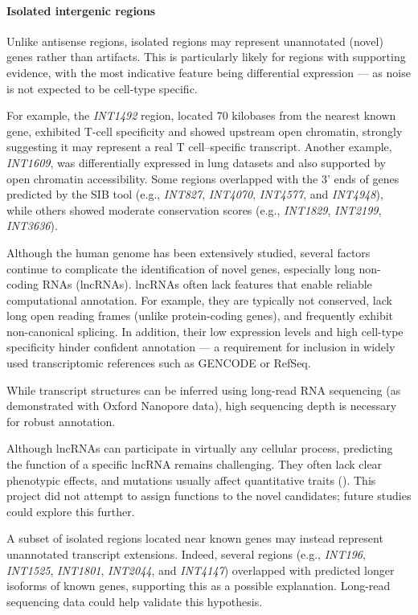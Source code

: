 \paragraph{Isolated intergenic regions}

Unlike antisense regions, isolated regions may represent unannotated (novel) genes rather than artifacts.
This is particularly likely for regions with supporting evidence,
with the most indicative feature being differential expression —
as noise is not expected to be cell-type specific.

For example, the \textit{INT1492} region, located 70 kilobases from the nearest known gene,
exhibited T-cell specificity and showed upstream open chromatin, strongly suggesting it may represent a real T cell–specific transcript.
Another example, \textit{INT1609}, was differentially expressed in lung datasets and also supported by open chromatin accessibility.
Some regions overlapped with the 3' ends of genes predicted by the SIB tool (e.g., \textit{INT827}, \textit{INT4070}, \textit{INT4577},
and \textit{INT4948}), while others showed moderate conservation scores (e.g., \textit{INT1829}, \textit{INT2199}, \textit{INT3636}).

Although the human genome has been extensively studied,
several factors continue to complicate the identification of novel genes, especially long non-coding RNAs (lncRNAs).
lncRNAs often lack features that enable reliable computational annotation.
For example, they are typically not conserved, lack long open reading frames (unlike protein-coding genes),
and frequently exhibit non-canonical splicing.
In addition, their low expression levels and high cell-type specificity hinder confident annotation —
a requirement for inclusion in widely used transcriptomic references such as GENCODE or RefSeq.

While transcript structures can be inferred using long-read RNA sequencing (as demonstrated with Oxford Nanopore data),
high sequencing depth is necessary for robust annotation.

Although lncRNAs can participate in virtually any cellular process, predicting the function of a specific lncRNA remains challenging.
They often lack clear phenotypic effects, and mutations usually affect quantitative traits (\cite{Mattick2023}).
This project did not attempt to assign functions to the novel candidates; future studies could explore this further.

A subset of isolated regions located near known genes may instead represent unannotated transcript extensions.
Indeed, several regions (e.g., \textit{INT196}, \textit{INT1525}, \textit{INT1801}, \textit{INT2044}, and \textit{INT4147}) overlapped with predicted longer isoforms of known genes,
supporting this as a possible explanation.
Long-read sequencing data could help validate this hypothesis.

